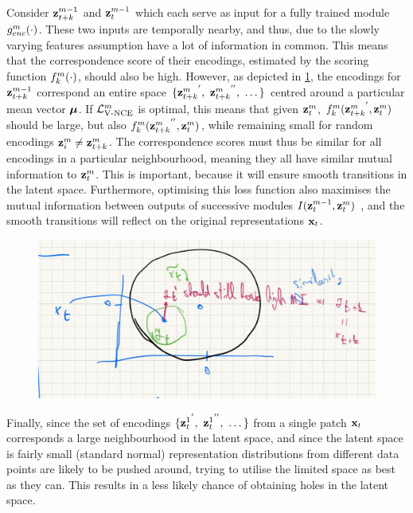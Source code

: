 			Consider $\mathbf{z}_{t+k}^{m-1}$ and $\mathbf{z}_t^{m-1}$ which each serve as input for a fully trained module $g_{enc}^m(\cdot)$. These two inputs are temporally nearby, and thus, due to the slowly varying features assumption \cite{zhangSlowFeatureAnalysis2012} have a lot of information in common. This means that the correspondence score of their encodings, estimated by the scoring function $f_k^m(\cdot)$, should also be high. However, as depicted in \ref{fig:gaussian-neighbourhood}, the encodings for $\mathbf{z}_{t+k}^{m-1}$ correspond an entire space $ \{ {\mathbf{z}_{t+k}^m}^{'},~{\mathbf{z}_{t+k}^m}^{''},~\dots \}$ centred around a particular mean vector $\bm{\mu}$. If $\mathcal{L}_{\text{V-NCE}}^m$ is optimal, this means that given $\mathbf{z}_t^m$, $f_k^m({\mathbf{z}_{t+k}^m}^{'}, {\mathbf{z}_t^m})$ should be  large, but also $f_k^m({\mathbf{z}_{t+k}^m}^{''}, {\mathbf{z}_t^m})$, while remaining small for random encodings $\mathbf{z}_i^m \neq \mathbf{z}_{t+k}^m$. The correspondence scores must thus be similar for all encodings in a particular neighbourhood, meaning they all have similar mutual information to $\mathbf{z}_t^{m}$. This is important, because it will ensure smooth transitions in the latent space. Furthermore, optimising this loss function also maximises the mutual information between outputs of successive modules $I(\mathbf{z}_t^{m-1}, \mathbf{z}_t^{m})$ \cite{lowePuttingEndEndtoEnd2020}, and the smooth transitions will reflect on the original representations $\mathbf{x}_t$.			 
		
		\begin{figure} %
			\centering
			\includegraphics[width=0.7\linewidth]{"gaussian neighbourhood"}
			\caption{}
			\label{fig:gaussian-neighbourhood}
		\end{figure}
		
			Finally, since the set of encodings $ \{ {\mathbf{z}_t^1}^{'},~{\mathbf{z}_t^1}^{''},~\dots \}$ from a single patch $\mathbf{x}_t$ corresponds a large neighbourhood in the latent space, and since the latent space is fairly small (standard normal) representation distributions from different data points are likely to be pushed around, trying to utilise the limited space as best as they can. This results in a less likely chance of obtaining holes in the latent space.
			
